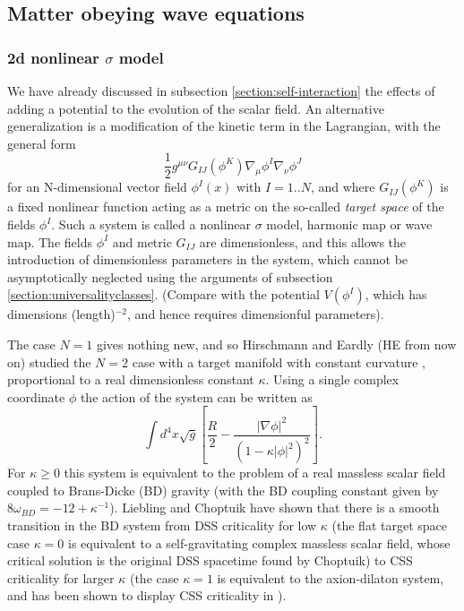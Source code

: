 \documentclass{article}
\begin{document}


\subsection{Matter obeying wave equations}

\subsubsection{2d nonlinear $\sigma$ model}
We have already discussed in subsection \ref{section:self-interaction}
the effects of adding a potential to the evolution of the scalar field.
An alternative generalization is a modification of the kinetic term in
the Lagrangian, with the general form
\begin{equation}
\frac{1}{2} g^{\mu\nu} G_{IJ}(\phi^K)\nabla_\mu\phi^I \nabla_\nu \phi^J
\end{equation}
for an N-dimensional vector field $\phi^I(x)$ with $I=1..N$, and where
$G_{IJ}(\phi^K)$ is a fixed nonlinear function acting as
a metric on the so-called {\em target space} of the fields $\phi^I$.
Such a system is called a nonlinear $\sigma$ model, harmonic map
or wave map.
The fields $\phi^I$ and metric $G_{IJ}$ are dimensionless,
and this allows the introduction of dimensionless parameters in the
system, which cannot be asymptotically neglected using the arguments of
subsection \ref{section:universalityclasses}.
(Compare with the potential $V(\phi^I)$, which has dimensions
(length)$^{-2}$, and hence requires dimensionful parameters).

The case $N=1$ gives nothing new, and so Hirschmann and Eardly
(HE from now on) studied the $N=2$ case with a target manifold with
constant curvature \cite{HE3}, proportional to a real dimensionless
constant $\kappa$. Using a single complex coordinate $\phi$ 
the action of the system can be written as
\begin{equation}
\int d^4x \sqrt{g} \left[ \frac{R}{2} 
   - \frac{|\nabla\phi|^2}{(1-\kappa|\phi|^2)^2} \right].
\end{equation}
For $\kappa\ge 0$ this system is equivalent to the problem of a
real massless scalar field coupled to Brans-Dicke (BD) gravity (with
the BD coupling constant given by $8\omega_{BD}=-12+ \kappa^{-1}$).
Liebling and Choptuik \cite{LieblingChoptuik} have shown that there is
a smooth transition in the BD system from DSS criticality for
low $\kappa$ (the flat target space case $\kappa=0$ is equivalent to a
self-gravitating complex massless scalar field,
whose critical solution is the original DSS spacetime found by
Choptuik) to CSS criticality for larger $\kappa$ (the case $\kappa=1$
is equivalent to the axion-dilaton system, and has been shown to
display CSS criticality in \cite{HamadeHorneStewart}).
\end{document}
